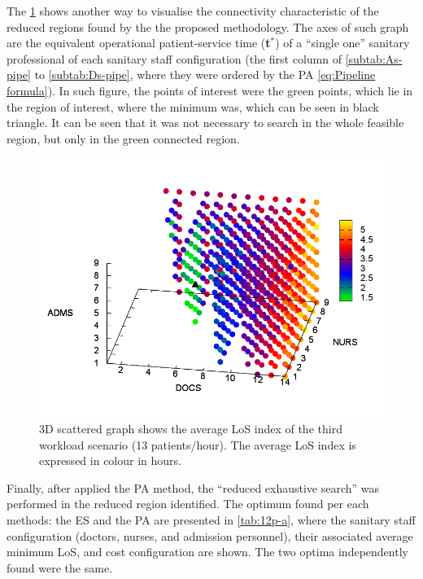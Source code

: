 \documentclass[11pt]{article} %
\begin{document}
The \ref{fig:3D-scattered-graph-75} shows another way to visualise
the connectivity characteristic of the reduced regions found by the
the proposed methodology. The axes of such graph are the equivalent
operational patient-service time ({\bf t$^*$}) 
of a ``single one'' sanitary professional of each sanitary staff
configuration (the first column of \ref{subtab:As-pipe} to \ref{subtab:Ds-pipe},
where they were ordered by the PA \ref{eq:Pipeline formula}). In
such figure, the points of interest were the green points, which lie
in the region of interest, where the minimum was, which can be seen
in black triangle. It can be seen that it was not necessary to search
in the whole feasible region, but only in the green connected region.
\begin{figure}[h]
\noindent \centering{}\includegraphics[width=0.88\columnwidth,height=0.2\paperheight]{figs4/v0/6400-602-75-3D-scatter-LoS2}
\caption{3D scattered graph shows the average LoS index of the third workload
scenario (13 patients/hour). The average LoS index is expressed in
colour in hours. \label{fig:3D-scattered-graph-75}}
\end{figure}

Finally, after applied the PA method, the \textquotedblleft{}reduced exhaustive search\textquotedblright{}
was performed in the reduced region identified. The optimum
found per each methods: the ES and the PA are presented in \ref{tab:12p-a}, where the sanitary staff
configuration (doctors, nurses, and admission personnel), their associated
average minimum LoS, and cost configuration are shown. The two optima
independently found were the same. 
\end{document}
